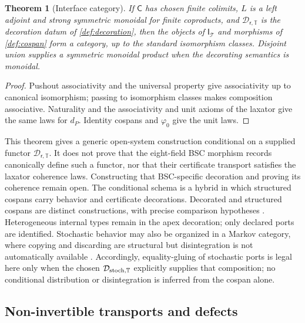 \documentclass[11pt,a4paper]{article}
\theoremstyle{definition}
\theoremstyle{plain}
\newtheorem{theorem}[definition]{Theorem}
\theoremstyle{remark}
\begin{document}
\begin{theorem}[Interface category]\label{thm:cospancat}
If \(\mathsf C\) has chosen finite colimits, \(L\) is a left adjoint and
strong symmetric monoidal for finite coproducts, and
\(\mathcal D_{\mathsf r,\mathbb T}\) is the decoration datum of
\cref{def:decoration}, then the objects of \(\mathsf I_{\mathcal T}\) and
morphisms of
\cref{def:cospan} form a category, up to the standard isomorphism classes.
Disjoint union supplies a symmetric monoidal product when the decorating
semantics is monoidal.
\end{theorem}
\begin{proof}
Pushout associativity and the universal property give associativity up to
canonical isomorphism; passing to isomorphism classes makes composition
associative.  Naturality and the associativity and unit axioms of the
laxator give the same laws for \(d_P\).  Identity cospans and
\(\varphi_0\) give the unit laws.
\end{proof}

This theorem gives a generic open-system construction conditional on a
supplied functor \(\mathcal D_{\mathsf r,\mathbb T}\).  It does not prove that
the eight-field BSC morphism records canonically define such a functor, nor
that their certificate transport satisfies the laxator coherence laws.
Constructing that BSC-specific decoration and proving its coherence remain
open.  The conditional schema is a hybrid in which structured cospans carry
behavior and certificate decorations.  Decorated and structured cospans are
distinct constructions, with precise comparison hypotheses
\citep{fong2015,baezcourser2020,baezcourservasilakopoulou2022}.
Heterogeneous internal types remain in the
apex decoration; only declared ports are identified.  Stochastic behavior may
also be organized in a Markov category, where copying and discarding are
structural but disintegration is not automatically available
\citep{fritz2020}.
Accordingly, equality-gluing of stochastic ports is legal here only when the
chosen \(\mathcal D_{\rm stoch,\mathbb T}\) explicitly supplies that
composition; no conditional distribution or disintegration is inferred from
the cospan alone.

\subsection{Non-invertible transports and defects}
\end{document}

